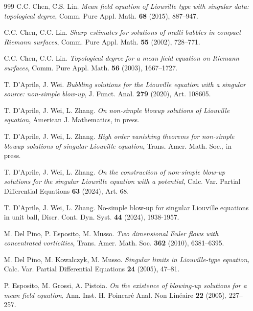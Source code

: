 \documentclass[reqno,11pt]{amsart}
\theoremstyle{definition}
\numberwithin{equation}{section}
\renewcommand{\(}{\left(}
\renewcommand{\)}{\right)}
\renewcommand{\[}{\left[}
\renewcommand{\]}{\right]}
\begin{document}
{\begin{thebibliography}{999}
 C.C. Chen, C.S. Lin. {\em Mean field equation of Liouville type with singular data: topological degree}, Comm. Pure
Appl. Math. {\bf 68}  (2015), 887--947.

 C.C. Chen, C.C. Lin. {\em Sharp estimates for solutions of multi-bubbles in compact Riemann surfaces}, Comm. Pure Appl. Math. {\bf 55} (2002), 728--771.

 C.C. Chen, C.C. Lin. {\em  Topological degree for a mean field equation on Riemann surfaces}, Comm. Pure Appl. Math. {\bf 56} (2003), 1667--1727.

 T. D’Aprile, J. Wei. {\em Bubbling solutions for the Liouville equation with a singular source: non-simple blow-up}, J. Funct. Anal. {\bf 279} (2020), Art. 108605.


 T. D'Aprile, J. Wei, L.  Zhang. {\em On non-simple blowup solutions of Liouville equation}, American J. Mathematics, in press. 

 T. D'Aprile, J. Wei, L.  Zhang. {\em High order vanishing theorems for non-simple blowup solutions of singular Liouville equation}, Trans. Amer. Math. Soc., in press. 


 T. D’Aprile, J. Wei, L. Zhang. {\em On the construction of non-simple blow-up solutions for the singular Liouville equation with a potential}, Calc. Var. Partial Differential Equations {\bf 63} (2024), Art. 68.

 T. D’Aprile, J. Wei, L. Zhang. {No-simple blow-up for singular Liouville equations in unit ball}, Discr. Cont. Dyn. Syst. {\bf 44} (2024), 1938-1957.




 M. Del Pino, P. Esposito, M. Musso. {\em Two dimensional Euler flows with concentrated vorticities}, Trans. Amer. Math. Soc. {\bf 362} (2010), 6381--6395.

 M. Del Pino, M. Kowalczyk, M. Musso. {\em Singular limits in Liouville-type equation,} Calc. Var. Partial Differential Equations {\bf 24} (2005), 47--81.

 P. Esposito, M. Grossi, A. Pistoia. {\em On the existence of blowing-up solutions for a mean field equation}, Ann. Inst. H. Poincar\'e Anal. Non Lin\'eaire {\bf 22} (2005), 227--257.


\end{thebibliography}}
\end{document}
